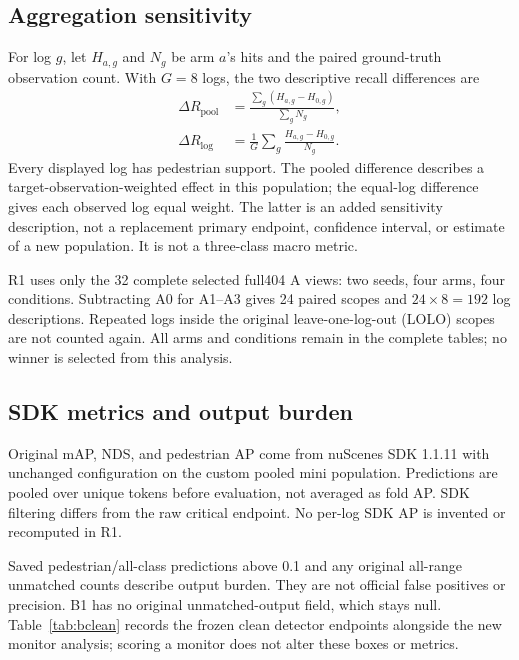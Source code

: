 \documentclass[conference]{IEEEtran}
\newcommand{\code}[1]{\texttt{\detokenize{#1}}}
\begin{document}
\subsection{Aggregation sensitivity}
For log $g$, let $H_{a,g}$ and $N_g$ be arm $a$'s hits and the paired ground-truth observation count. With $G=8$ logs, the two descriptive recall differences are
\begin{align}
\Delta R_{\mathrm{pool}}&=\frac{\sum_g(H_{a,g}-H_{0,g})}{\sum_gN_g},\\
\Delta R_{\mathrm{log}}&=\frac{1}{G}\sum_g\frac{H_{a,g}-H_{0,g}}{N_g}.
\end{align}
Every displayed log has pedestrian support. The pooled difference describes a target-observation-weighted effect in this population; the equal-log difference gives each observed log equal weight. The latter is an added sensitivity description, not a replacement primary endpoint, confidence interval, or estimate of a new population. It is not a three-class macro metric.

R1 uses only the 32 complete selected full404 A views: two seeds, four arms, four conditions. Subtracting A0 for A1--A3 gives 24 paired scopes and $24\times8=192$ log descriptions. Repeated logs inside the original leave-one-log-out (LOLO) scopes are not counted again. All arms and conditions remain in the complete tables; no winner is selected from this analysis.

\subsection{SDK metrics and output burden}
Original mAP, NDS, and pedestrian AP come from nuScenes SDK 1.1.11 with unchanged \code{detection_cvpr_2019} configuration on the custom pooled mini population. Predictions are pooled over unique tokens before evaluation, not averaged as fold AP. SDK filtering differs from the raw critical endpoint. No per-log SDK AP is invented or recomputed in R1.

Saved pedestrian/all-class predictions above 0.1 and any original all-range unmatched counts describe output burden. They are not official false positives or precision. B1 has no original unmatched-output field, which stays null. Table~\ref{tab:bclean} records the frozen clean detector endpoints alongside the new monitor analysis; scoring a monitor does not alter these boxes or metrics.

\end{document}

